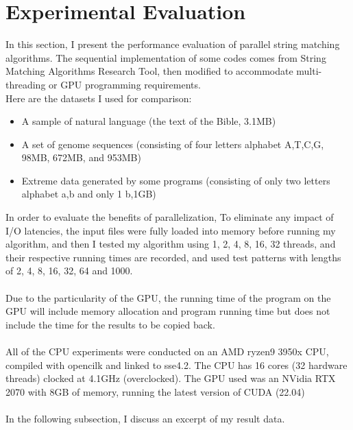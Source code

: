 \documentclass[11pt]{article}       %
\newcommand{\includeFig}[3]      {\begin{figure}[htb] \begin{center}
                                 \includegraphics
                                 [width=4in,keepaspectratio] %
                                 {#2}\caption{\label{#1}#3} \end{center} \end{figure}}
\begin{document}

\section{Experimental Evaluation} \label{expEval}

In this section, I present the performance evaluation of parallel string matching algorithms. The sequential implementation of some codes comes from String Matching Algorithms Research Tool, then modified to accommodate multi-threading or GPU programming requirements.\\

Here are the datasets I used for comparison:
\begin{itemize}
  \item A sample of natural language (the text of the Bible, 3.1MB) 
  \item A set of genome sequences (consisting of four letters alphabet {A,T,C,G}, 98MB, 672MB, and 953MB)
  \item Extreme data generated by some programs (consisting of only two letters alphabet {a,b} and only 1 b,1GB)
\end{itemize}
In order to evaluate the benefits of parallelization, To eliminate any impact of I/O latencies, the input files were fully loaded into memory before running my algorithm, and then I tested my algorithm using 1, 2, 4, 8, 16, 32 threads, and their respective running times are recorded, and used test patterns with lengths of 2, 4, 8, 16, 32, 64 and 1000.\\
\\Due to the particularity of the GPU, the running time of the program on the GPU will include memory allocation and program running time but does not include the time for the results to be copied back.\\
 \\All of the CPU experiments were conducted on an AMD ryzen9 3950x CPU, compiled with opencilk and linked to sse4.2. The CPU has 16 cores (32 hardware threads) clocked at 4.1GHz (overclocked). The GPU used was an NVidia RTX 2070 with 8GB of memory, running the latest version of CUDA (22.04)\\
\\In the following subsection, I discuss an excerpt of my result data.
\end{document}
